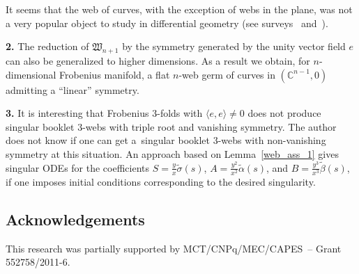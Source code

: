 \documentclass[pdftex]{sigma}
\begin{document}
It seems that the web of curves, with the exception of webs in the plane, was not a very popular object to study in dif\/ferential geometry (see surveys~\cite{GSr} and~\cite{AGh}).

{\bf 2.} The reduction of $\mathfrak{W}_{n+1}$ by the symmetry generated by the unity vector f\/ield $e$ can also be generalized to higher dimensions. As a result we obtain, for $n$-dimensional Frobenius manifold, a f\/lat $n$-web germ of curves in $(\mathbb C^{n-1},0)$ admitting a ``linear'' symmetry.

{\bf 3.} It is interesting that Frobenius $3$-folds with $\langle e,e\rangle \ne 0$ does not produce singular booklet $3$-webs with triple root and vanishing symmetry. The author does not know if one can get a~singular booklet $3$-webs with non-vanishing symmetry at this situation. An approach based on Lemma~\ref{web_ass_1} gives singular ODEs for the coef\/f\/icients
$S=\frac{y}{x}\tilde{\sigma}(s)$, $A=\frac{y^2}{x^2}\tilde{\alpha}(s)$, and $B=\frac{y^3}{x^3}\tilde{\beta}(s)$, if one imposes initial conditions corresponding to the desired singularity.

\subsection*{Acknowledgements}

This research was partially supported by MCT/CNPq/MEC/CAPES~-- Grant 552758/2011-6.
\end{document}
